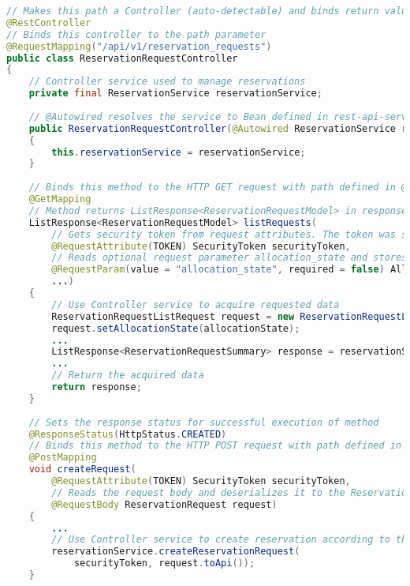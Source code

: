 \begin{lstlisting}[language=java, caption=ReservationRequestController.java, label=lst:controller]
// Makes this path a Controller (auto-detectable) and binds return values of methods to the HTTP request body
@RestController
// Binds this controller to the path parameter
@RequestMapping("/api/v1/reservation_requests")
public class ReservationRequestController
{
    // Controller service used to manage reservations
    private final ReservationService reservationService;
    
    // @Autowired resolves the service to Bean defined in rest-api-servlet.xml
    public ReservationRequestController(@Autowired ReservationService reservationService)
    {
        this.reservationService = reservationService;
    }
    
    // Binds this method to the HTTP GET request with path defined in @RequestMapping
    @GetMapping
    // Method returns ListResponse<ReservationRequestModel> in response body thanks to @RestController annotation
    ListResponse<ReservationRequestModel> listRequests(
        // Gets security token from request attributes. The token was stored there when AuthFilter processed the request.
        @RequestAttribute(TOKEN) SecurityToken securityToken,
        // Reads optional request parameter allocation_state and stores it in allocationState variable
        @RequestParam(value = "allocation_state", required = false) AllocationState allocationState,
        ...)
    {
        // Use Controller service to acquire requested data
        ReservationRequestListRequest request = new ReservationRequestListRequest();
        request.setAllocationState(allocationState);
        ...
        ListResponse<ReservationRequestSummary> response = reservationService.listReservationRequests(request);
        ...
        // Return the acquired data
        return response;
    }
    
    // Sets the response status for successful execution of method
    @ResponseStatus(HttpStatus.CREATED)
    // Binds this method to the HTTP POST request with path defined in @RequestMapping
    @PostMapping
    void createRequest(
        @RequestAttribute(TOKEN) SecurityToken securityToken,
        // Reads the request body and deserializes it to the ReservationRequest object
        @RequestBody ReservationRequest request)
    {
        ...
        // Use Controller service to create reservation according to the requested data
        reservationService.createReservationRequest(
            securityToken, request.toApi());
    }
    

\end{lstlisting}
